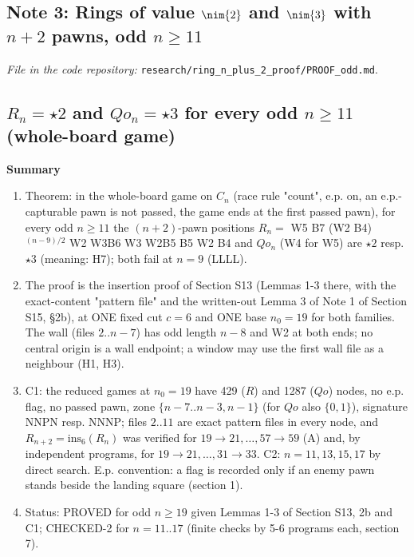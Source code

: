 \subsection{Note 3: Rings of value $\nim{2}$ and $\nim{3}$ with $n+2$ pawns, odd $n\ge11$}

\noindent\emph{File in the code repository:} \texttt{research/ring\_n\_plus\_2\_proof/PROOF\_odd.md}.\par


\subsection*{$R_n=\star2$ and $Qo_n=\star3$ for every odd $n\ge 11$ (whole-board game)}
\textbf{Summary}

\begin{enumerate}
\item Theorem: in the whole-board game on $C_n$ (race rule "count", e.p. on, an e.p.-capturable pawn is not passed, the game ends at the first passed pawn), for every odd $n\ge11$ the $(n+2)$-pawn positions $R_n=$ W5 B7 (W2 B4)$^{(n-9)/2}$ W2 W3B6 W3 W2B5 B5 W2 B4 and $Qo_n$ (W4 for W5) are $\star2$ resp. $\star3$ (meaning: H7); both fail at $n=9$ (LLLL).
\item The proof is the insertion proof of Section S13 (Lemmas 1-3 there, with the exact-content "pattern file" and the written-out Lemma 3 of Note 1 of Section S15, §2b), at ONE fixed cut $c=6$ and ONE base $n_0=19$ for both families. The wall (files $2..n-7$) has odd length $n-8$ and W2 at both ends; no central origin is a wall endpoint; a window may use the first wall file as a neighbour (H1, H3).
\item C1: the reduced games at $n_0=19$ have 429 ($R$) and 1287 ($Qo$) nodes, no e.p. flag, no passed pawn, zone $\{n-7..n-3,n-1\}$ (for $Qo$ also $\{0,1\}$), signature NNPN resp. NNNP; files $2..11$ are exact pattern files in every node, and $R_{n+2}=\mathrm{ins}_6(R_n)$ was verified for $19\to21,\dots,57\to59$ (A) and, by independent programs, for $19\to21,\dots,31\to33$. C2: $n=11,13,15,17$ by direct search. E.p. convention: a flag is recorded only if an enemy pawn stands beside the landing square (section 1).
\item Status: PROVED for odd $n\ge19$ given Lemmas 1-3 of Section S13, 2b and C1; CHECKED-2 for $n=11..17$ (finite checks by 5-6 programs each, section 7).
\end{enumerate}
